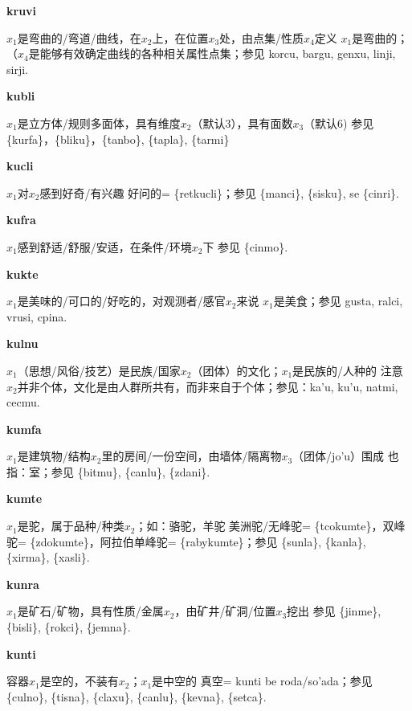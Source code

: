 \documentclass[notitlepage,twocolumn,a4paper,10pt]{book}
\begin{document}
{\sffamily\bfseries kruvi}  $x_1$是弯曲的\slash{}弯道\slash{}曲线，在$x_2$上，在位置$x_3$处，由点集\slash{}性质$x_4$定义 \textemdash{} $x_1$是弯曲的；（$x_4$是能够有效确定曲线的各种相关属性点集；参见 {korcu}, {bargu}, {genxu}, {linji}, {sirji}.

{\sffamily\bfseries kubli}\enspace {\ttfamily\bfseries[kub]}  $x_1$是立方体\slash{}规则多面体，具有维度$x_2$（默认3），具有面数$x_3$（默认6) \textemdash{} 参见 \{kurfa\}，\{bliku\}，\{tanbo\}, \{tapla\}, \{tarmi\}

{\sffamily\bfseries kucli} $x_1$对$x_2$感到好奇\slash{}有兴趣 \textemdash{} 好问的= \{retkucli\}；参见 \{manci\}, \{sisku\}, se \{cinri\}.

{\sffamily\bfseries kufra}\enspace {\ttfamily\bfseries[kuf]}  $x_1$感到舒适\slash{}舒服\slash{}安适，在条件\slash{}环境$x_2$下 \textemdash{} 参见 \{cinmo\}.

{\sffamily\bfseries kukte}\enspace {\ttfamily\bfseries[kuk]}  $x_1$是美味的\slash{}可口的\slash{}好吃的，对观测者\slash{}感官$x_2$来说 \textemdash{} $x_1$是美食；参见 {gusta}, {ralci}, {vrusi}, {cpina}.

{\sffamily\bfseries kulnu}\enspace {\ttfamily\bfseries[    klu]}  $x_1$（思想\slash{}风俗\slash{}技艺）是民族\slash{}国家$x_2$（团体）的文化；$x_1$是民族的\slash{}人种的 \textemdash{} 注意$x_2$并非个体，文化是由人群所共有，而非来自于个体；参见：{ka'u}, {ku'u}, {natmi}, {cecmu}.

{\sffamily\bfseries kumfa}\enspace {\ttfamily\bfseries[kum     ku'a]}  $x_1$是建筑物\slash{}结构$x_2$里的房间\slash{}一份空间，由墙体\slash{}隔离物$x_3$（团体\slash{}jo'u）围成 \textemdash{} 也指：室；参见 \{bitmu\}, \{canlu\}, \{zdani\}.

{\sffamily\bfseries kumte} $x_1$是驼，属于品种\slash{}种类$x_2$；如：骆驼，羊驼 \textemdash{} 美洲驼\slash{}无峰驼= \{tcokumte\}，双峰驼= \{zdokumte\}，阿拉伯单峰驼= \{rabykumte\}；参见 \{sunla\}, \{kanla\}, \{xirma\}, \{xasli\}.

{\sffamily\bfseries kunra}\enspace {\ttfamily\bfseries[kun]}  $x_1$是矿石\slash{}矿物，具有性质\slash{}金属$x_2$，由矿井\slash{}矿洞\slash{}位置$x_3$挖出 \textemdash{} 参见 \{jinme\}, \{bisli\}, \{rokci\}, \{jemna\}.

{\sffamily\bfseries kunti}\enspace {\ttfamily\bfseries[kut]}  容器$x_1$是空的，不装有$x_2$；$x_1$是中空的 \textemdash{} 真空= kunti be roda\slash{}so'ada；参见 \{culno\}, \{tisna\}, \{claxu\}, \{canlu\}, \{kevna\}, \{setca\}.
\end{document}
